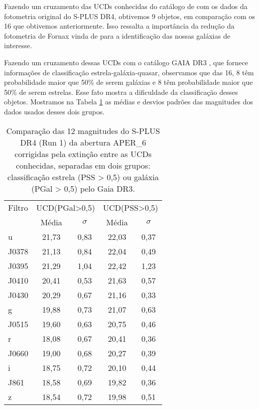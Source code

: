 Fazendo um cruzamento das UCDs conhecidas do catálogo de \cite{catalog_ucds} com os dados da fotometria original do S-PLUS DR4, obtivemos 9 objetos, em comparação com os 16 que obtivemos anteriormente. Isso ressalta a importância da redução da fotometria de Fornax vinda de \cite{haack2024splusfornaxprojectsfp} para a identificação das nossas galáxias de interesse.

Fazendo um cruzamento dessas UCDs com o catálogo GAIA DR3 \citep{GAIA_DR3}, que fornece informações de classificação estrela-galáxia-quasar, observamos que das 16, 8 têm probabilidade maior que 50\% de serem galáxias e 8 têm probabilidade maior que 50\% de serem estrelas. Esse fato mostra a dificuldade da classificação desses objetos. Mostramos na Tabela \ref{tab_ucds_stars_galaxy_like} as médias e desvios padrões das magnitudes dos dados usados desses dois grupos.

\begin{table}[!ht]
    \centering
    \caption{Comparação das 12 magnitudes do S-PLUS DR4 (Run 1) da abertura APER\_6 corrigidas pela extinção entre as UCDs conhecidas, separadas em dois grupos: classificação estrela (PSS > 0,5) ou galáxia (PGal > 0,5) pelo Gaia DR3.}   
    \begin{tabular}{lcccc}
        \toprule
        Filtro & \multicolumn{2}{c}{UCD(PGal>0,5)} & \multicolumn{2}{c}{UCD(PSS>0,5)} \\
        & Média & $\sigma$ & Média & $\sigma$ \\
        \midrule
        u & 21,73 & 0,83 & 22,03 & 0,37 \\
        J0378 & 21,13 & 0,84 & 22,04 & 0,49 \\
        J0395 & 21,29 & 1,04 & 22,42 & 1,23 \\
        J0410 & 20,41 & 0,53 & 21,63 & 0,57 \\
        J0430 & 20,29 & 0,67 & 21,16 & 0,33 \\
        g    & 19,88 & 0,73 & 21,07 & 0,63 \\
        J0515 & 19,60 & 0,63 & 20,75 & 0,46 \\
        r    & 18,08 & 0,67 & 20,41 & 0,36 \\
        J0660 & 19,00 & 0,68 & 20,27 & 0,39 \\
        i    & 18,75 & 0,72 & 20,10 & 0,44 \\
        J861 & 18,58 & 0,69 & 19,82 & 0,36 \\
        z    & 18,54 & 0,72 & 19,98 & 0,51 \\
        \bottomrule
    \end{tabular}
    \label{tab_ucds_stars_galaxy_like}
\end{table}

